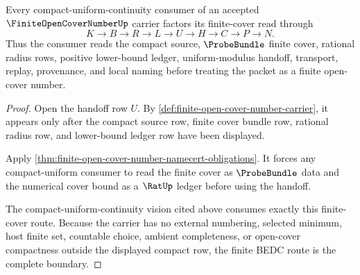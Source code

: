 \begin{theorem}
\label{thm:finite-open-cover-number-compact-uniform-route}
Every compact-uniform-continuity consumer of an accepted $\FiniteOpenCoverNumberUp$ carrier factors its finite-cover read through
$$
K \to B \to R \to L \to U \to H \to C \to P \to N .
$$
Thus the consumer reads the compact source, $\ProbeBundle$ finite cover, rational radius rows, positive lower-bound ledger, uniform-modulus handoff, transport, replay, provenance, and local naming before treating the packet as a finite open-cover number.
\end{theorem}
\begin{proof}
Open the handoff row $U$. By \autoref{def:finite-open-cover-number-carrier}, it appears only after the compact source row, finite cover bundle row, rational radius row, and lower-bound ledger row have been displayed.

Apply \autoref{thm:finite-open-cover-number-namecert-obligations}. It forces any compact-uniform consumer to read the finite cover as $\ProbeBundle$ data and the numerical cover bound as a $\RatUp$ ledger before using the handoff.

The compact-uniform-continuity vision cited above consumes exactly this finite-cover route. Because the carrier has no external numbering, selected minimum, host finite set, countable choice, ambient completeness, or open-cover compactness outside the displayed compact row, the finite BEDC route is the complete boundary.
\end{proof}




